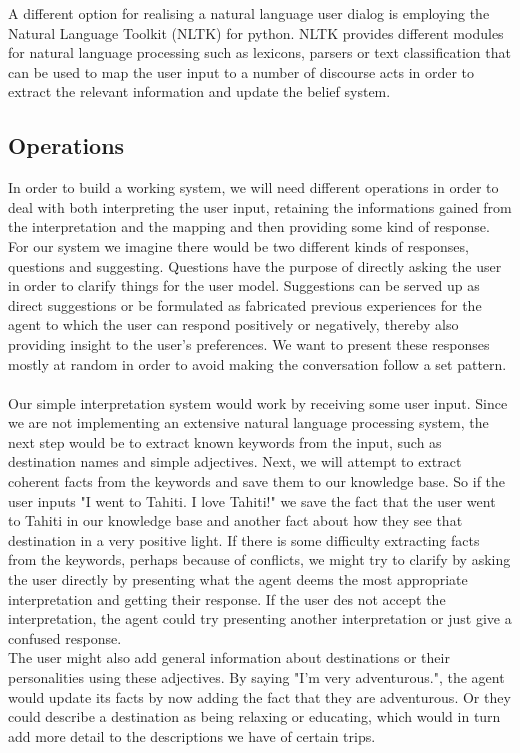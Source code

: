 \documentclass[11pt]{article} %
\begin{document}
A different option for realising a natural language
user dialog is employing the Natural Language Toolkit
(NLTK) for python. NLTK provides different modules
for natural language processing such as lexicons,
parsers or text classification that can be used to
map the user input to a number of discourse acts in
order to extract the relevant information and update
the belief system.

\subsection{Operations}

In order to build a working system, we will need different operations in order to deal with both interpreting the user input, retaining the informations gained from the interpretation and the mapping and then providing some kind of response. For our system we imagine there would be two different kinds of responses, questions and suggesting. Questions have the purpose of directly asking the user in order to clarify things for the user model. Suggestions can be served up as direct suggestions or be formulated as fabricated previous experiences for the agent to which the user can respond positively or negatively, thereby also providing insight to the user's preferences.
We want to present these responses mostly at random in order to avoid making the conversation follow a set pattern.
\\
\\
Our simple interpretation system would work by receiving some user input. Since we are not implementing an extensive natural language processing system, the next step would be to extract known keywords from the input, such as destination names and simple adjectives. Next, we will attempt to extract coherent facts from the keywords and save them to our knowledge base. So if the user inputs "I went to Tahiti. I love Tahiti!"  we save the fact that the user went to Tahiti in our knowledge base and another fact about how they see that destination in a very positive light. If there is some difficulty extracting facts from the keywords, perhaps because of conflicts, we might try to clarify by asking the user directly by presenting what the agent deems the most appropriate interpretation and getting their response. If the user des not accept the interpretation, the agent could try presenting another interpretation or just give a confused response.
\\
The user might also add general information about destinations or their personalities using these adjectives. By saying "I'm very adventurous.", the agent would update its facts by now adding the fact that they are adventurous. Or they could describe a destination as being relaxing or educating, which would in turn add more detail to the descriptions we have of certain trips.
\end{document}
